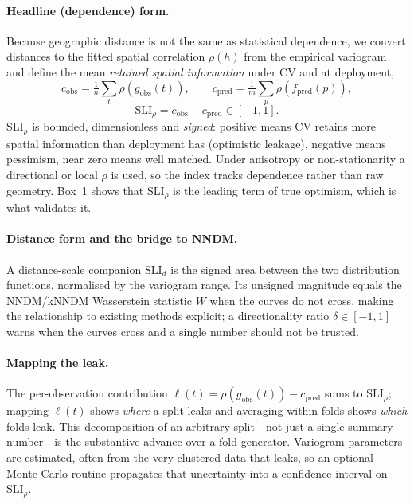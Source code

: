\documentclass[11pt,a4paper]{article}
\newcommand{\SLI}{\mathrm{SLI}}
\newcommand{\SLIrho}{\SLI_{\rho}}
\newcommand{\SLId}{\SLI_{d}}
\begin{document}
\paragraph{Headline (dependence) form.} Because geographic distance is not the same
as statistical dependence, we convert distances to the fitted spatial correlation
$\rho(h)$ from the empirical variogram and define the mean \emph{retained spatial
information} under CV and at deployment,
\[
c_{\text{obs}}=\tfrac1n\textstyle\sum_t\rho\!\left(g_{\text{obs}}(t)\right),\qquad
c_{\text{pred}}=\tfrac1m\textstyle\sum_p\rho\!\left(f_{\text{pred}}(p)\right),
\]
\[
\boxed{\ \SLIrho=c_{\text{obs}}-c_{\text{pred}}\in[-1,1].\ }
\]
$\SLIrho$ is bounded, dimensionless and \emph{signed}: positive means CV retains more
spatial information than deployment has (optimistic leakage), negative means
pessimism, near zero means well matched. Under anisotropy or non-stationarity a
directional or local $\rho$ is used, so the index tracks dependence rather than raw
geometry. Box~1 shows that $\SLIrho$ is the leading term of true optimism, which is
what validates it.

\paragraph{Distance form and the bridge to NNDM.} A distance-scale companion
$\SLId$ is the signed area between the two distribution functions, normalised by the
variogram range. Its unsigned magnitude equals the NNDM/kNNDM Wasserstein statistic
$W$ when the curves do not cross, making the relationship to existing methods
explicit; a directionality ratio $\delta\in[-1,1]$ warns when the curves cross and a
single number should not be trusted.

\paragraph{Mapping the leak.} The per-observation contribution
$\ell(t)=\rho(g_{\text{obs}}(t))-c_{\text{pred}}$ sums to $\SLIrho$; mapping
$\ell(t)$ shows \emph{where} a split leaks and averaging within folds shows
\emph{which} folds leak. This decomposition of an arbitrary split---not just a
single summary number---is the substantive advance over a fold generator. Variogram
parameters are estimated, often from the very clustered data that leaks, so an
optional Monte-Carlo routine propagates that uncertainty into a confidence interval
on $\SLIrho$.
\end{document}
